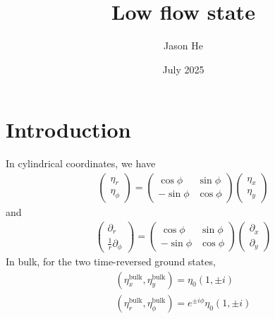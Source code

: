 \documentclass[aps,prl,preprint]{revtex4-2}
\begin{document}
\title{Low flow state}
\author{Jason He}
\date{July 2025}


\section{Introduction}
In cylindrical coordinates, we have
\begin{align}
    \begin{pmatrix}
        \eta_r \\ \eta_\phi
    \end{pmatrix}
     = \begin{pmatrix}
         \cos{\phi} & \sin{\phi} \\
         -\sin{\phi} & \cos{\phi}
     \end{pmatrix}
     \begin{pmatrix}
         \eta_x \\ \eta_y
     \end{pmatrix}
\end{align}
and
\begin{align}
    \begin{pmatrix}
        \partial_r \\ \frac{1}{r}\partial_\phi
    \end{pmatrix}
     = \begin{pmatrix}
         \cos{\phi} & \sin{\phi} \\
         -\sin{\phi} & \cos{\phi}
     \end{pmatrix}
     \begin{pmatrix}
         \partial_x \\ \partial_y
     \end{pmatrix}
\end{align}
In bulk, for the two time-reversed ground states,
\begin{align}
    (\eta^\text{bulk}_x, \eta^\text{bulk}_y) = \eta_0(1, \pm i)\\
    (\eta^\text{bulk}_r, \eta^\text{bulk}_\phi) = e^{\pm i\phi}\eta_0(1, \pm i)
\end{align}
\end{document}

